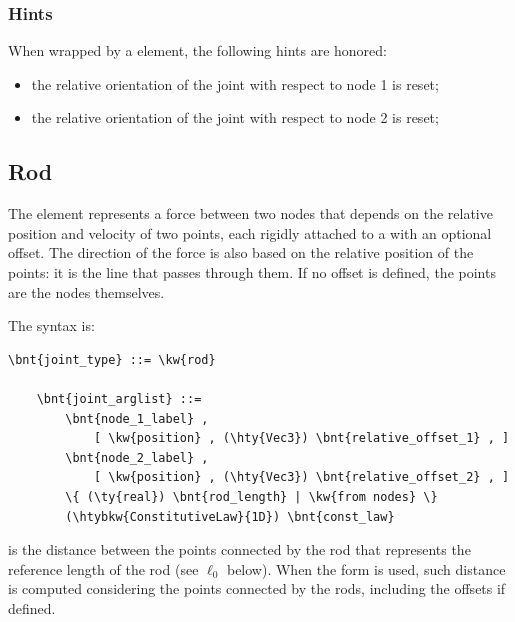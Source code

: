 \subsubsection{Hints}
When wrapped by a  element, the following hints are honored:
\begin{itemize}
\item {} the relative orientation of the joint
with respect to node 1 is reset;
\item {} the relative orientation of the joint
with respect to node 2 is reset;
\end{itemize}



\subsection{Rod}\label{sec:EL:STRUCT:JOINT:ROD}
The  element represents a force between two nodes that depends
on the relative position and velocity of two points, each rigidly attached
to a  with an optional offset.
The direction of the force is also based on the relative position
of the points: it is the line that passes through them.
If no offset is defined, the points are the nodes themselves.

The syntax is:
\begin{Verbatim}[commandchars=\\\{\}]
    \bnt{joint_type} ::= \kw{rod}

    \bnt{joint_arglist} ::=
        \bnt{node_1_label} ,
            [ \kw{position} , (\hty{Vec3}) \bnt{relative_offset_1} , ]
        \bnt{node_2_label} , 
            [ \kw{position} , (\hty{Vec3}) \bnt{relative_offset_2} , ]
        \{ (\ty{real}) \bnt{rod_length} | \kw{from nodes} \}
        (\htybkw{ConstitutiveLaw}{1D}) \bnt{const_law}
\end{Verbatim}
 is the distance between the points connected by the rod that represents the reference length of the rod (see $\ell_0$ below).
When the form  is used, such distance is computed considering the points connected by the rods, including the offsets if defined.

